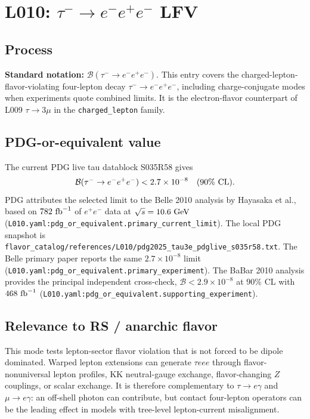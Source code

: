 
\section{L010: \texorpdfstring{\(\tau^- \to e^-e^+e^-\)}{tau -> 3e} LFV}

\subsection*{Process}
\textbf{Standard notation:}
\(\mathcal{B}(\tau^- \to e^-e^+e^-)\).
This entry covers the charged-lepton-flavor-violating four-lepton decay
\(\tau^- \to e^-e^+e^-\), including charge-conjugate modes when experiments
quote combined limits.  It is the electron-flavor counterpart of L009
\(\tau\to3\mu\) in the \texttt{charged\_lepton} family.

\subsection*{PDG-or-equivalent value}
The current PDG live tau datablock S035R58 gives
\[
  \mathcal{B}(\tau^- \to e^-e^+e^-) < 2.7\times 10^{-8}
  \quad (90\%~{\rm CL}).
\]
PDG attributes the selected limit to the Belle 2010 analysis by Hayasaka
et al., based on \(782~{\rm fb}^{-1}\) of \(e^+e^-\) data at
\(\sqrt{s}=10.6~{\rm GeV}\)
(\texttt{L010.yaml:pdg\_or\_equivalent.primary\_current\_limit}).  The local
PDG snapshot is
\texttt{flavor\_catalog/references/L010/pdg2025\_tau3e\_pdglive\_s035r58.txt}.
The Belle primary paper reports the same \(2.7\times10^{-8}\) limit
(\texttt{L010.yaml:pdg\_or\_equivalent.primary\_experiment}).  The BaBar 2010
analysis provides the principal independent cross-check,
\(\mathcal{B}<2.9\times10^{-8}\) at \(90\%\) CL with \(468~{\rm fb}^{-1}\)
(\texttt{L010.yaml:pdg\_or\_equivalent.supporting\_experiment}).

\subsection*{Relevance to RS / anarchic flavor}
This mode tests lepton-sector flavor violation that is not forced to be
dipole dominated.  Warped lepton extensions can generate
\(\tau eee\) through flavor-nonuniversal lepton profiles, KK neutral-gauge
exchange, flavor-changing \(Z\) couplings, or scalar exchange.  It is therefore
complementary to \(\tau\to e\gamma\) and \(\mu\to e\gamma\): an off-shell
photon can contribute, but contact four-lepton operators can be the leading
effect in models with tree-level lepton-current misalignment.

